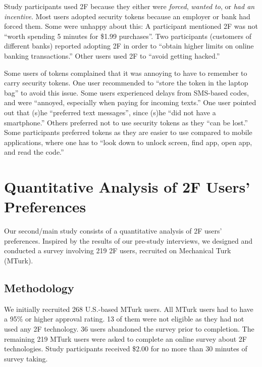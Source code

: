 \documentclass[conference]{IEEEtran}
\begin{document}
Study participants used 2F because they either were \emph{forced}, \emph{wanted to}, or \emph{had an incentive}. Most users adopted security tokens because an employer or bank had forced them. Some were unhappy about this: A participant mentioned 2F was not ``worth spending 5 minutes for \$1.99 purchases''. Two participants (customers of different banks) reported adopting 2F in order to ``obtain higher limits on online banking transactions.'' Other users used 2F to ``avoid getting hacked.'' 

Some users of tokens complained that it was annoying to have to remember to carry security tokens. One user recommended to ``store the token in the laptop bag'' to avoid this issue. Some users experienced delays from SMS-based codes, and
were ``annoyed, especially when paying for incoming texts.'' One user pointed out that (s)he ``preferred text messages'', since
(s)he ``did not have a smartphone.'' Others preferred not to use security tokens as they ``can be lost.'' Some participants
preferred tokens as they are easier to use compared to mobile applications, where one has to ``look down to unlock screen, find
app, open app, and read the code.'' 










\section{Quantitative Analysis of 2F Users' Preferences}\vspace{0.2cm}

Our second/main study consists of a quantitative analysis of 2F users' preferences.
Inspired by the results of our pre-study interviews, we designed and conducted a survey involving 219 2F users, recruited on Mechanical Turk (MTurk). 


\subsection{Methodology} 
We initially recruited 268 U.S.-based MTurk users. All MTurk users had to have a 95\% or higher approval rating. 13 of them were not eligible as they had not used any 2F technology. 36 users abandoned the survey prior to completion. The remaining 219 MTurk users were asked to complete an online survey about 2F technologies. Study participants received \$2.00 for no more than 30 minutes of survey taking. 
\end{document}
